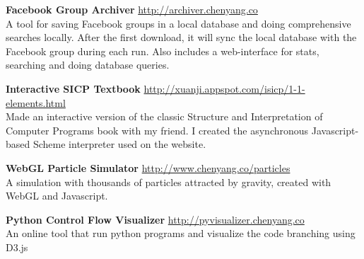 \documentclass[9pt]{article}
\newenvironment{changemargin}[2]{%
  \begin{list}{}{%
      \setlength{\topsep}{0pt}%
      \setlength{\leftmargin}{#1}%
      \setlength{\rightmargin}{#2}%
      \setlength{\listparindent}{\parindent}%
      \setlength{\itemindent}{\parindent}%
      \setlength{\parsep}{\parskip}%
    }%
  \item[]}{\end{list}
}
\newenvironment{body} {
  \vspace*{-16pt}
  \begin{changemargin}{-0.25in}{-0.5in}
  }
  {\end{changemargin}
}
\begin{document}
\begin{body}
  \vspace{14pt}

  \textbf{Facebook Group Archiver} \hfill \url{http://archiver.chenyang.co}\\
  A tool for saving Facebook groups in a local database and doing comprehensive searches locally. After the first download, it will sync the local database with the Facebook group during each run. Also includes a web-interface for stats, searching and doing database queries. \\
  \medskip

  \textbf{Interactive SICP Textbook} \hfill \url{http://xuanji.appspot.com/isicp/1-1-elements.html}\\
  Made an interactive version of the classic Structure and Interpretation of Computer Programs book with my friend. I created the asynchronous Javascript-based Scheme interpreter used on the website.\\
  \medskip

  \textbf{WebGL Particle Simulator} \hfill \url{http://www.chenyang.co/particles}\\
  A simulation with thousands of particles attracted by gravity, created with  WebGL and Javascript. \\
  \medskip

\textbf{Python Control Flow Visualizer} \hfill \url{http://pyvisualizer.chenyang.co}\\
An online tool that run python programs and visualize the code branching using D3.js\\
\medskip




\end{body}
\end{document}
